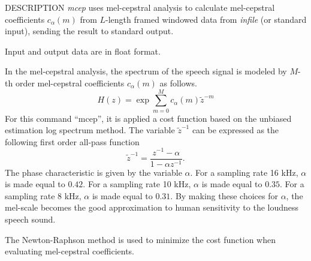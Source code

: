 \begin{synopsis}
\item [mcep] [ --a $A$ ] [ --m $M$ ] [ --l $L$ ] [ --q $Q$ ] [ --i $I$ ] [ --j $J$ ] 
	     [ --d $D$ ] [ --e $E$ ] [ --f $F$ ]
\item [\ ~~~~~~~~] [ {\em infile} ]
\end{synopsis}

\begin{qsection}{DESCRIPTION}
{\em mcep} uses mel-cepstral analysis 
to calculate mel-cepstral coefficients $c_{\alpha}(m)$ 
from $L$-length framed windowed data from {\em infile} (or standard input), 
sending the result to standard output.

Input and output data are in float format.

In the mel-cepstral analysis, the spectrum of the speech signal
is modeled by $M$-th order mel-cepstral coefficients $c_{\alpha}(m)$
as follows.
\begin{displaymath}
H(z) = \exp \sum_{m=0}^M c_{\alpha}(m) \tilde{z}^{-m} 
\end{displaymath}
For this command ``mcep'', it is applied a cost function
based on the unbiased estimation log spectrum method.
The variable $\tilde{z}^{-1}$ can be expressed as the following
first order all-pass function
\begin{displaymath}
\tilde{z}^{-1} = \frac{z^{-1}-\alpha}{1-\alpha z^{-1}}.
\end{displaymath}
The phase characteristic is given by the variable $\alpha$.
For a sampling rate 16 kHz, $\alpha$ is made equal to $0.42$.
For a sampling rate 10 kHz, $\alpha$ is made equal to $0.35$.
For a sampling rate 8 kHz, $\alpha$ is made equal to $0.31$.
By making these choices for $\alpha$,
the mel-scale becomes the good approximation to human
sensitivity to the loudness speech sound.

The Newton-Raphson method is used to minimize the cost function
when evaluating mel-cepstral coefficients.
\end{qsection}

